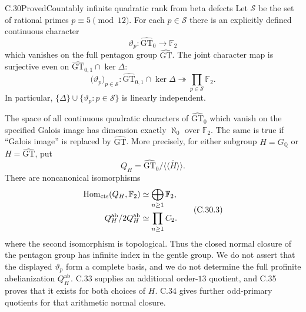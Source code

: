 \begin{statement}{C.30}{Proved}{Countably infinite quadratic rank from beta defects}
Let $\mathcal S$ be the set of rational primes $p\equiv5\pmod {12}$.
For each $p\in\mathcal S$ there is an explicitly defined continuous
character
\[
 \vartheta_p:\widehat{\mathrm{GT}}_0\longrightarrow\mathbb F_2
 \tag{C.30.1}
\]
which vanishes on the full pentagon group $\widehat{\mathrm{GT}}$.
The joint character map is surjective even on
$\widehat{\mathrm{GT}}_{0,1}\cap\ker\Delta$:
\[
 \bigl(\vartheta_p\bigr)_{p\in\mathcal S}:
 \widehat{\mathrm{GT}}_{0,1}\cap\ker\Delta
 \twoheadrightarrow\prod_{p\in\mathcal S}\mathbb F_2.
 \tag{C.30.2}
\]
In particular, $\{\Delta\}\cup\{\vartheta_p:p\in\mathcal S\}$
is linearly independent.

The space of all continuous quadratic characters of
$\widehat{\mathrm{GT}}_0$ which vanish on the specified Galois image
has dimension exactly $\aleph_0$ over $\mathbb F_2$. The same is true
if ``Galois image'' is replaced by $\widehat{\mathrm{GT}}$.
More precisely, for either subgroup $H=G_{\mathbb Q}$ or
$H=\widehat{\mathrm{GT}}$, put
\[
 Q_H=\widehat{\mathrm{GT}}_0/\overline{\langle\!\langle H\rangle\!\rangle}.
\]
There are noncanonical isomorphisms
\[
 \begin{aligned}
 \operatorname{Hom}_{\mathrm{cts}}(Q_H,\mathbb F_2)
       &\simeq\bigoplus_{n\geq1}\mathbb F_2,\\
 Q_H^{\mathrm{ab}}/2Q_H^{\mathrm{ab}}
       &\simeq\prod_{n\geq1}C_2.
 \end{aligned}
 \tag{C.30.3}
\]
where the second isomorphism is topological. Thus the closed normal
closure of the pentagon group has infinite index in the gentle group.
We do not assert that the displayed $\vartheta_p$ form a complete
basis, and we do not determine the full profinite abelianization
$Q_H^{\mathrm{ab}}$.
C.33 supplies an additional order-$13$ quotient, and C.35
proves that it exists for both choices of $H$.
C.34 gives further odd-primary quotients for that arithmetic
normal closure.
\end{statement}
